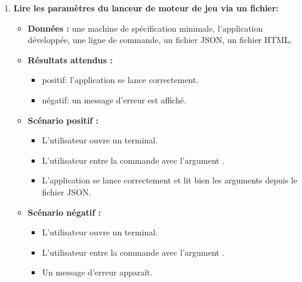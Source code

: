 \begin{enumerate}
    \item \textbf{Lire les paramètres du lanceur de moteur de jeu via un fichier:}
    \begin{itemize}
        \item \textbf{Données :} une machine de spécification minimale, l'application développée, une ligne de commande, un fichier JSON, un fichier HTML.
        \item \textbf{Résultats attendus :} 
        \begin{itemize}
            \item positif: l'application se lance correctement. \item négatif: un message d'erreur est affiché.
        \end{itemize}
        \item \textbf{Scénario positif :}
        \begin{itemize}
            \item L’utilisateur ouvre un terminal.
            \item L’utilisateur entre la commande avec l'argument .
            \item L'application se lance correctement et lit bien les arguments depuis le fichier JSON.
        \end{itemize}
        \item \textbf{Scénario négatif :}
        \begin{itemize}
            \item L’utilisateur ouvre un terminal.
            \item L’utilisateur entre la commande avec l'argument .
            \item Un message d'erreur apparaît.
        \end{itemize}
    \end{itemize}


\end{enumerate}
